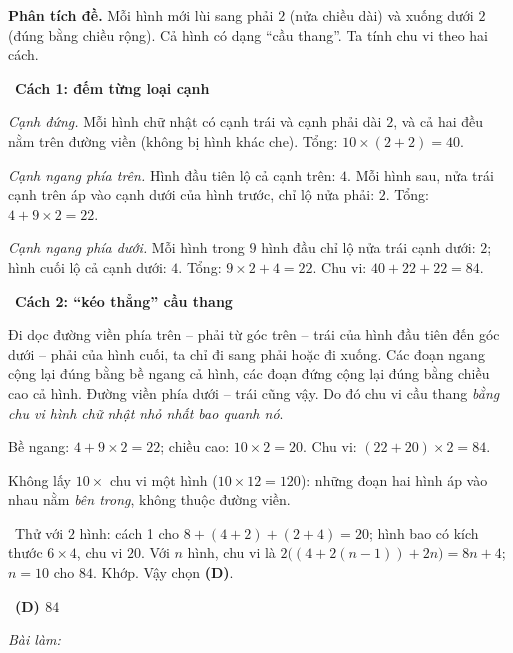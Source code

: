 \documentclass[11pt]{article}
\newif\ifsol \solfalse
\providecommand{\AnsWord}{Đáp số}
\newcommand{\StuProb}[2]{\begin{probboxS}{#1}{#2}\StuProbBody\end{probboxS}}
\newcommand{\ans}[1]{\par\smallskip{\bfseries\color{tmGreen!88!black}\AnsWord:}\ {\bfseries\color{AnsRed}#1}\par}
\newcommand{\probsol}[1]{%
  \begin{lrbox}{\solmeasure}\begin{minipage}{\dimexpr\linewidth-24pt\relax}#1\end{minipage}\end{lrbox}%
  \ifsol
    \begin{solbox}#1\end{solbox}%
  \else
    \setlength{\solht}{\dimexpr\ht\solmeasure+\dp\solmeasure+0.85cm\relax}%
    \ifdim\solht<1.35cm\setlength{\solht}{1.35cm}\fi
    \ifdim\solht>\StudentMaxWork\setlength{\solht}{\StudentMaxWork}\fi
    \par\noindent\begin{minipage}{\linewidth}%
    \expandafter\StuProb\StuProbArgs
    \begin{tcolorbox}[colback=white,colframe=Line,boxrule=0.8pt,arc=5pt,
      left=8pt,right=8pt,top=4pt,bottom=4pt,height=\solht]{\footnotesize\color{Slate}\itshape\WorkWord}\end{tcolorbox}%
    \end{minipage}\par\medskip
  \fi}
\newlength{\StudentMaxWork}\setlength{\StudentMaxWork}{4.5cm}
\newcommand{\step}[2]{\par\smallskip\noindent{\bfseries\color{tmBlue!85!black}\StepWord~#1.}\ {\bfseries #2}\par\nopagebreak}
\newcommand{\verify}[1]{\par\smallskip\noindent{\bfseries\color{tmGreen!80!black}\faCheckCircle\ \CheckWord}\ #1\par}
\def\WorkWord{Bài làm:}
\def\AnsWord{Đáp số}
\def\StepWord{Bước}
\def\CheckWord{Thử lại:}
\begin{document}
\probsol{
\textbf{Phân tích đề.} Mỗi hình mới lùi sang phải $2$ (nửa chiều dài) và xuống dưới $2$ (đúng bằng chiều
rộng). Cả hình có dạng ``cầu thang''. Ta tính chu vi theo hai cách.

\step{1}{Cách 1: đếm từng loại cạnh}
\emph{Cạnh đứng.} Mỗi hình chữ nhật có cạnh trái và cạnh phải dài $2$, và cả hai đều nằm trên đường viền
(không bị hình khác che). Tổng: $10\times(2+2)=40$.

\emph{Cạnh ngang phía trên.} Hình đầu tiên lộ cả cạnh trên: $4$. Mỗi hình sau, nửa trái cạnh trên áp vào
cạnh dưới của hình trước, chỉ lộ nửa phải: $2$. Tổng: $4+9\times 2=22$.

\emph{Cạnh ngang phía dưới.} Mỗi hình trong $9$ hình đầu chỉ lộ nửa trái cạnh dưới: $2$; hình cuối lộ cả
cạnh dưới: $4$. Tổng: $9\times 2+4=22$. Chu vi: $40+22+22=84$.

\step{2}{Cách 2: ``kéo thẳng'' cầu thang}
\begin{proofbox}Đi dọc đường viền phía trên -- phải từ góc trên -- trái của hình đầu tiên đến góc dưới --
phải của hình cuối, ta chỉ đi sang phải hoặc đi xuống. Các đoạn ngang cộng lại đúng bằng bề ngang cả hình,
các đoạn đứng cộng lại đúng bằng chiều cao cả hình. Đường viền phía dưới -- trái cũng vậy. Do đó chu vi
cầu thang \emph{bằng chu vi hình chữ nhật nhỏ nhất bao quanh nó}.\end{proofbox}
Bề ngang: $4+9\times 2=22$; chiều cao: $10\times 2=20$. Chu vi: $(22+20)\times 2=84$.

\begin{warnbox}Không lấy $10\times$ chu vi một hình ($10\times 12=120$): những đoạn hai hình áp vào nhau
nằm \emph{bên trong}, không thuộc đường viền.\end{warnbox}
\verify{Thử với $2$ hình: cách 1 cho $8+(4+2)+(2+4)=20$; hình bao có kích thước $6\times 4$, chu vi $20$.
Với $n$ hình, chu vi là $2\big((4+2(n-1))+2n\big)=8n+4$; $n=10$ cho $84$. Khớp. Vậy chọn \textbf{(D)}.}
\ans{(D) $84$}
}
\end{document}
